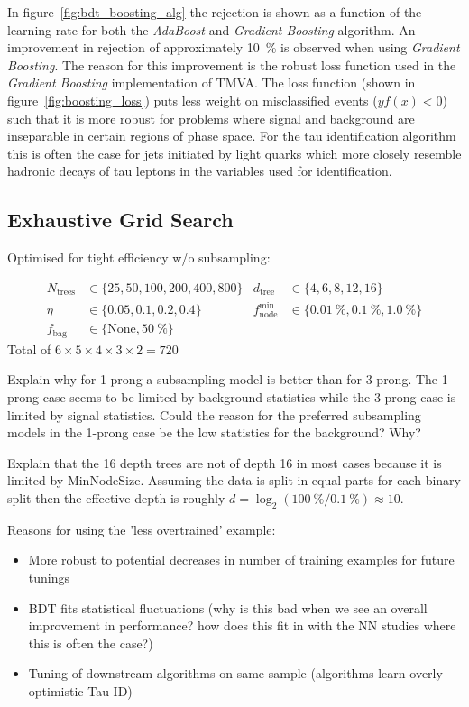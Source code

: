 In figure~\ref{fig:bdt_boosting_alg} the rejection is shown as a function of the
learning rate for both the \emph{AdaBoost} and \emph{Gradient Boosting}
algorithm. An improvement in rejection of approximately \SI{10}{\percent} is
observed when using \emph{Gradient Boosting}. The reason for this improvement is
the robust loss function used in the \emph{Gradient Boosting} implementation of
TMVA. The loss function (shown in figure~\ref{fig:boosting_loss}) puts less
weight on misclassified events ($y f(x) < 0$) such that it is more robust for
problems where signal and background are inseparable in certain regions of phase
space. For the tau identification algorithm this is often the case for jets
initiated by light quarks which more closely resemble hadronic decays of tau
leptons in the variables used for identification.

\subsection{Exhaustive Grid Search}
\label{sec:bdt_grid_search}

Optimised for tight efficiency w/o subsampling:

\begin{align*}
  N_\mathrm{trees} &\in \{25, 50, 100, 200, 400, 800\} &
  d_\mathrm{tree} &\in \{4, 6, 8, 12, 16\} \\
  \eta &\in \{0.05, 0.1, 0.2, 0.4\} &
  f_\mathrm{node}^\mathrm{min} &\in \{\SI{0.01}{\percent}, \SI{0.1}{\percent},\SI{1.0}{\percent}\} \\
  f_\text{bag} &\in \{\text{None}, \SI{50}{\percent} \}
\end{align*}
Total of $6 \times 5 \times 4 \times 3 \times 2 = 720$

Explain why for 1-prong a subsampling model is better than for 3-prong. The
1-prong case seems to be limited by background statistics while the 3-prong case
is limited by signal statistics. Could the reason for the preferred subsampling
models in the 1-prong case be the low statistics for the background? Why?

Explain that the 16 depth trees are not of depth 16 in most cases because it is
limited by MinNodeSize. Assuming the data is split in equal parts for each
binary split then the effective depth is roughly
$d = \log_2(\SI{100}{\percent} / \SI{0.1}{\percent}) \approx 10$.

Reasons for using the 'less overtrained' example:
\begin{itemize}
\item More robust to potential decreases in number of training examples for
  future tunings
\item BDT fits statistical fluctuations (why is this bad when we see an overall
  improvement in performance? how does this fit in with the NN studies where
  this is often the case?)
\item Tuning of downstream algorithms on same sample (algorithms learn overly
  optimistic Tau-ID)
\end{itemize}

